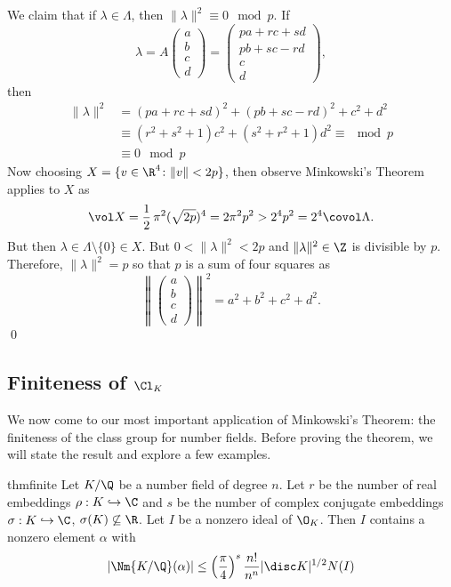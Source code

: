 We claim that if $\lambda \in \Lambda$, then $\|\lambda\|^2 \equiv 0 \mod p$. If
	\[
	\lambda=A\begin{pmatrix} a \\ b \\ c \\ d \end{pmatrix}= 
	\begin{pmatrix}
	pa + rc + sd \\
	pb + sc - rd \\
	c \\
	d
	\end{pmatrix},
	\]
then 
	\[
	\begin{split}
	\|\lambda\|^2&= (pa+rc+sd)^2 + (pb+sc-rd)^2 + c^2 + d^2 \\
	&\equiv (r^2+s^2+1)c^2 + (s^2+r^2+1)d^2 \equiv \mod p \\
	&\equiv 0 \mod p
	\end{split}
	\]
Now choosing $X=\{v \in \R^4 \colon \|v\|<2p\}$, then observe Minkowski's Theorem applies to $X$ as
	\[
	\vol X = \dfrac{1}{2}\, \pi^2 (\sqrt{2p})^4= 2\pi^2p^2> 2^4p^2=2^4 \covol \Lambda.
	\]
But then $\lambda \in \Lambda \setminus \{0\} \in X$. But $0<\|\lambda\|^2<2p$ and $\|\lambda\|^2 \in \Z$ is divisible by $p$. Therefore, $\|\lambda\|^2=p$ so that $p$ is a sum of four squares as
	\[
	\left\| \begin{pmatrix}
	a \\
	b \\
	c \\
	d
	\end{pmatrix}
	\right\|^2= a^2+b^2+c^2+d^2. 
	\]
\qed \\



\subsection{Finiteness of $\Cl_K$}

We now come to our most important application of Minkowski's Theorem: the finiteness of the class group for number fields. Before proving the theorem, we will state the result and explore a few examples.

\begin{restatable}{thm}{finite}\label{thm:finite}
Let $K/\Q$ be a number field of degree $n$. Let $r$ be the number of real embeddings $\rho: K \hookrightarrow \C$ and $s$ be the number of complex conjugate embeddings $\sigma: K \hookrightarrow \C$, $\sigma(K) \not\subseteq \R$. Let $I$ be a nonzero ideal of $\O_K$. Then $I$ contains a nonzero element $\alpha$ with
	\[
	|\Nm{K/\Q}(\alpha)| \leq \left(\dfrac{\pi}{4}\right)^s \dfrac{n!}{n^n} |\disc K|^{1/2} N(I)
	\]
\end{restatable}

